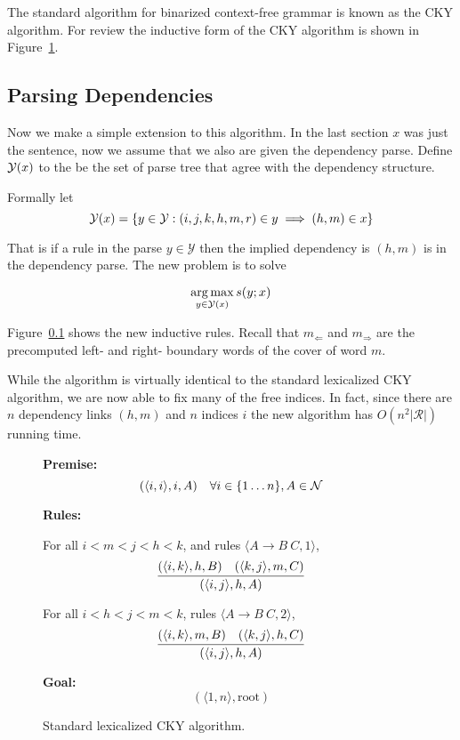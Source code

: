 \documentclass[11pt,letterpaper]{article}
\newcommand{\rules}{\mathcal{R}}
\newcommand{\Left}[1]{#1_{\Leftarrow}}
\newcommand{\Right}[1]{#1_{\Rightarrow}}
\newcommand{\Span}[1]{\langle #1 \rangle}
\begin{document}



The standard algorithm for binarized context-free grammar is known as the CKY algorithm. For review
the inductive form of the CKY algorithm is shown in Figure~\ref{fig:cky}.


\subsection{Parsing Dependencies}

Now we make a simple extension to this algorithm. In the last section $x$ was just the sentence, now we assume that we also are given the dependency parse. Define ${\cal Y}(x)$ to the be the set of parse tree that agree with the dependency structure.

Formally let \[ {\cal Y}(x)= \{ y \in {\cal Y}: \\ (i, j, k, h, m, r) \in y \implies (h, m) \in x \} \]

That is if a rule in the parse $y \in \mathcal{Y}$ then the implied dependency is $(h, m)$ is in the dependency parse. The new problem is to solve

\[ \operatorname*{arg\,max}_{y \in {\cal Y}(x)} s(y;x) \]

Figure~\ref{} shows the new inductive rules.
Recall that $\Left{m}$ and $\Right{m}$ are the precomputed left- and right- boundary words of the cover of word $m$.

While the algorithm is virtually identical to the standard lexicalized CKY algorithm, we are now able to fix many of the free indices. In fact, since there are $n$ dependency links $(h, m)$ and $n$ indices $i$ the new algorithm has $O(n^2|\rules|)$ running time.


\begin{figure}
  \noindent \textbf{Premise:}
  \[(\Span{i, i}, i, A)\ \ \ \forall i \in \{1 \ldots n\}, A \in {\cal N}\]

  \noindent\textbf{Rules:}


   For all  $i< m < j< h <k$,  and  rules  $\langle A \rightarrow B\ C, 1\rangle$,
   \[\infer{( \Span{i, j},  h,  A)}{( \Span{i, k}, h, B)  &  ( \Span{k, j}, m, C) } \]

   For all  $i< h < j< m <k$, rules  $\langle A \rightarrow B\ C,  2\rangle$,
   \[\infer{(\Span{i, j},  h, A)}{(\Span{i, k}, m, B)  &  (\Span{k, j}, h, C) }  \]

\noindent \textbf{Goal:}\[ (\Span{1, n},\mathrm{root})\]
\label{fig:cky}
\caption{Standard lexicalized CKY algorithm. }

\end{figure}
\end{document}
